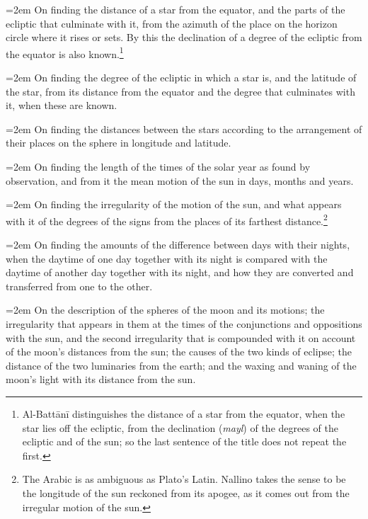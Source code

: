 \documentclass[11pt]{article}
\newcommand{\ArPage}[1]{\marginpar{\footnotesize\color{gray}Ar.\,p.\,#1}}
\begin{document}
\par\noindent\hangindent=2em On finding the distance of a star from the equator, and the parts of the ecliptic that culminate with it, from the azimuth of the place on the horizon circle where it rises or sets. By this the declination of a degree of the ecliptic from the equator is also known.\footnote{Al-Battānī distinguishes the distance of a star from the equator, when the star lies off the ecliptic, from the declination (\emph{mayl}) of the degrees of the ecliptic and of the sun; so the last sentence of the title does not repeat the first.}\par
\par\noindent\hangindent=2em On finding the degree of the ecliptic in which a star is, and the latitude of the star, from its distance from the equator and the degree that culminates with it, when these are known.\par
\par\noindent\hangindent=2em On finding the distances between the stars according to the arrangement of their places on the sphere in longitude and latitude.\par
\par\noindent\hangindent=2em On finding the length of the times of the solar year as found by observation, and from it the mean motion of the sun in days, months and years.\par
\par\noindent\hangindent=2em On finding the irregularity of the motion of the sun, and what appears with it of the degrees of the signs from the places of its farthest distance.\footnote{The Arabic is as ambiguous as Plato's Latin. Nallino takes the sense to be the longitude of the sun reckoned from its apogee, as it comes out from the irregular motion of the sun.}\par
\par\noindent\hangindent=2em On finding the amounts of the difference between days with their nights, when the daytime of one day together with its night is compared with the daytime of another day together with its night, and how they are converted and transferred from one to the other.\par
\par\noindent\hangindent=2em \ArPage{4}On the description of the spheres of the moon and its motions; the irregularity that appears in them at the times of the conjunctions and oppositions with the sun, and the second irregularity that is compounded with it on account of the moon's distances from the sun; the causes of the two kinds of eclipse; the distance of the two luminaries from the earth; and the waxing and waning of the moon's light with its distance from the sun.\par
\end{document}
